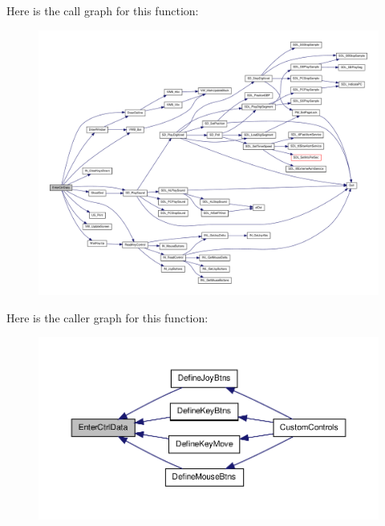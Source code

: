 Here is the call graph for this function:
\nopagebreak
\begin{figure}[H]
\begin{center}
\leavevmode
\includegraphics[width=400pt]{WL__MENU_8H_a94d0412c951284a8ea98378116c23566_cgraph}
\end{center}
\end{figure}




Here is the caller graph for this function:
\nopagebreak
\begin{figure}[H]
\begin{center}
\leavevmode
\includegraphics[width=400pt]{WL__MENU_8H_a94d0412c951284a8ea98378116c23566_icgraph}
\end{center}
\end{figure}


